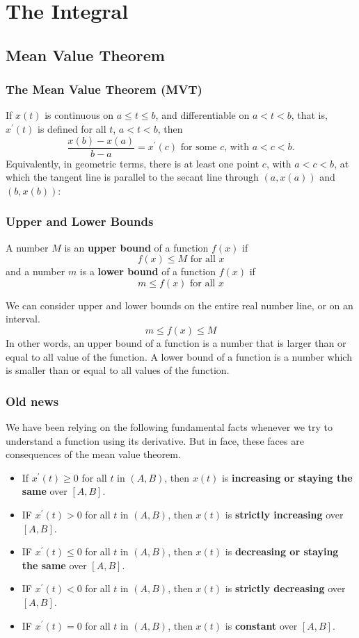 \chapter{The Integral}
\section{Mean Value Theorem}
\subsection{The Mean Value Theorem (MVT)}
If $x(t)$ is continuous on $a\le t\le b$, and differentiable on $a<t<b$, that is, $x^\prime(t)$ is defined for all $t$, $a<t<b$, then
\[
\frac{x(b)-x(a)}{b-a}=x^\prime(c)\text{ for some $c$, with $a<c<b$.}
\]
Equivalently, in geometric terms, there is at least one point $c$, with $a<c<b$, at which the tangent line is parallel to the secant line through $(a,x(a))$ and $(b,x(b))$:
\subsection{Upper and Lower Bounds}
A number $M$ is an \textbf{upper bound} of a function $f(x)$ if
\[f(x)\le M\text{ for all }x\]
and a number $m$ is a \textbf{lower bound} of a function $f(x)$ if
\[m\le f(x)\text{ for all }x\]

We can consider upper and lower bounds on the entire real number line, or on an interval.
\[m\le f(x)\le M\]
In other words, an upper bound of a function is a number that is larger than or equal to all value of the function. A lower bound of a function is a number which is smaller than or equal to all values of the function.
\subsection{Old news}
We have been relying on the following fundamental facts whenever we try to understand a function using its derivative. But in face, these faces are consequences of the mean value theorem.
\begin{itemize}
\item If $x^\prime(t)\ge0$ for all $t$ in $(A,B)$, then $x(t)$ is \textbf{increasing or staying the same} over $[A,B]$.
\item IF $x^\prime(t)>0$ for all $t$ in $(A,B)$, then $x(t)$ is \textbf{strictly increasing} over $[A,B]$.
\item IF $x^\prime(t)\le0$ for all $t$ in $(A,B)$, then $x(t)$ is \textbf{decreasing or staying the same} over $[A,B]$.
\item IF $x^\prime(t)<0$ for all $t$ in $(A,B)$, then $x(t)$ is \textbf{strictly decreasing} over $[A,B]$.
\item IF $x^\prime(t)=0$ for all $t$ in $(A,B)$, then $x(t)$ is \textbf{constant} over $[A,B]$.
\end{itemize}
